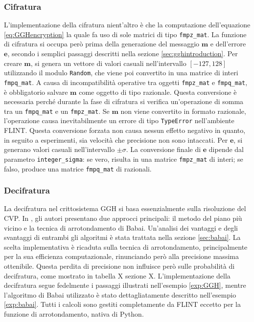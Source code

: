 \subsubsection{Cifratura}

L'implementazione della cifratura nient'altro è che la computazione dell'equazione 
\ref{eq:GGHencryption} la quale fa uso di sole matrici di tipo \texttt{fmpz\_mat}.
La funzione di cifratura si occupa però prima della generazione del messaggio $\mathbf{m}$ 
e dell'errore $\mathbf{e}$, secondo i semplici passaggi descritti nella sezione 
\ref{sec:gghintroduction}. 
Per creare $\mathbf{m}$, si genera un vettore di valori casuali nell'intervallo 
$[-127, 128]$ utilizzando il modulo \texttt{Random}, che viene poi convertito in 
una matrice di interi \texttt{fmpq\_mat}. 
A causa di incompatibilità operative tra oggetti \texttt{fmpz\_mat} e \texttt{fmpq\_mat}, è
obbligatorio salvare $\mathbf{m}$ come oggetto di tipo razionale. Questa conversione 
è necessaria perché durante la fase di cifratura si verifica un'operazione di somma 
tra un \texttt{fmpq\_mat} e un \texttt{fmpz\_mat}. Se $\mathbf{m}$ non viene convertito 
in formato razionale, l'operazione causa inevitabilmente un errore di tipo 
\texttt{TypeError} nell'ambiente FLINT. Questa conversione forzata non causa nessun effetto
negativo in quanto, in seguito a esperimenti, sia velocità che precisione non sono intaccati.  
Per $\mathbf{e}$, si generano valori 
casuali nell'intervallo $\pm \sigma$. La conversione finale di $\mathbf{e}$ dipende 
dal parametro \texttt{integer\_sigma}: se vero, risulta in una matrice \texttt{fmpz\_mat} 
di interi; se falso, produce una matrice \texttt{fmpq\_mat} di razionali. 

\subsubsection{Decifratura}

La decifratura nel crittosistema GGH si basa essenzialmente sulla risoluzione del CVP. 
In \cite{GGH97}, gli autori presentano due approcci principali: il metodo del piano più 
vicino e la tecnica di arrotondamento di Babai. Un'analisi dei vantaggi e 
degli svantaggi di entrambi gli algoritmi è stata trattata nella sezione \ref{sec:babai}. 
La scelta implementativa è ricaduta sulla tecnica di arrotondamento, principalmente per la sua 
efficienza computazionale, rinunciando però alla precisione massima ottenibile. Questa perdita
di precisione non influisce però sulle probabilità di decifratura, come mostrato in tabella
X sezione X. 
L'implementazione della decifratura segue fedelmente i passaggi illustrati nell'esempio 
\ref{exp:GGH}, mentre l'algoritmo di Babai utilizzato è stato dettagliatamente descritto 
nell'esempio \ref{exp:babai}. Tutti i calcoli sono gestiti completamente da FLINT eccetto
per la funzione di arrotondamento, nativa di Python. 

